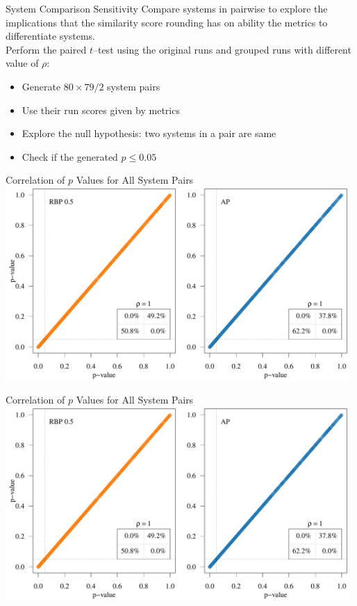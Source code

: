 \documentclass{beamer}
\begin{document}
\begin{frame}{System Comparison Sensitivity}
Compare systems in pairwise to explore the {\color{blue}implications} that the {\color{blue}similarity score rounding} has on ability the metrics to {\color{blue}differentiate} systems.\\[1.7em]

Perform the paired $t$--test using the {\color{blue}original runs} and {\color{blue}grouped runs} with different value of $\rho$:
\begin{itemize}
\item Generate \alert{$80 \times 79 / 2$ system pairs} 
\item Use their run scores given by metrics
\item Explore the \alert{null hypothesis}: two systems in a pair are same
\item Check if the generated \alert{$p \leq 0.05$}
\end{itemize}
 
\end{frame}

\begin{frame}{Correlation of $p$ Values for All System Pairs}
\includegraphics[width=0.98\textwidth, page=1]{figs/p_scatter_for_talk.pdf}
\end{frame}

\begin{frame}{Correlation of $p$ Values for All System Pairs}
\includegraphics[width=0.98\textwidth, page=3]{figs/p_scatter_for_talk.pdf}
\end{frame}
\end{document}
